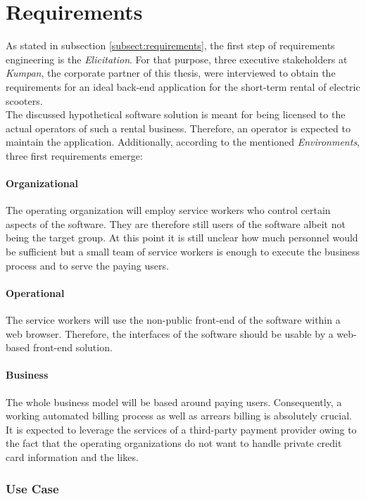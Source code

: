 \documentclass[12pt,a4paper,twoside]{report}
\begin{document}
\section{Requirements} \label{subsect:hypothetical-requirements}

As stated in subsection \ref{subsect:requirements}, the first step of
requirements engineering is the \textit{Elicitation}.
For that purpose, three executive stakeholders
at \textit{Kumpan}, the corporate partner of this thesis, were interviewed
to obtain the requirements for an ideal back-end application for the
short-term rental of electric scooters.\\
The discussed hypothetical software solution is meant for being licensed to
the actual operators of such a rental business. Therefore, an operator
is expected to maintain the application. Additionally, according to the
mentioned \textit{Environments}, three first requirements emerge:

\paragraph{Organizational}
The operating organization will employ service workers who
control certain aspects of the software. They are therefore still users of the
software albeit not being the target group. At this point it is still unclear
how much personnel would be sufficient but a small team of service workers is
enough to execute the business process and to serve the paying users.

\paragraph{Operational}
The service workers will use the non-public front-end of the software within a
web browser. Therefore, the interfaces of the software should be usable by
a web-based front-end solution.

\paragraph{Business}
The whole business model will be based around paying users. Consequently,
a working automated billing process as well as arrears billing is absolutely
crucial. It is expected to leverage the services of a third-party payment
provider owing to the fact that the operating organizations do not want to
handle private credit card information and the likes.


\subsubsection{Use Case}
\end{document}
